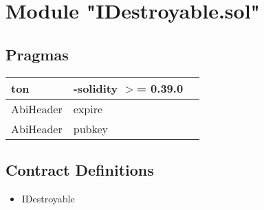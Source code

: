 
\section{Module "IDestroyable.sol"}


\subsection{Pragmas}


\noindent\begin{tabular}{|l|l|p{5cm}|}\hline
ton & -solidity $>$= 0.39.0 &\\\hline
AbiHeader &  expire &\\\hline
AbiHeader &  pubkey &\\\hline
\end{tabular}


\subsection{Contract Definitions}

\begin{itemize}
\item IDestroyable
\end{itemize}
